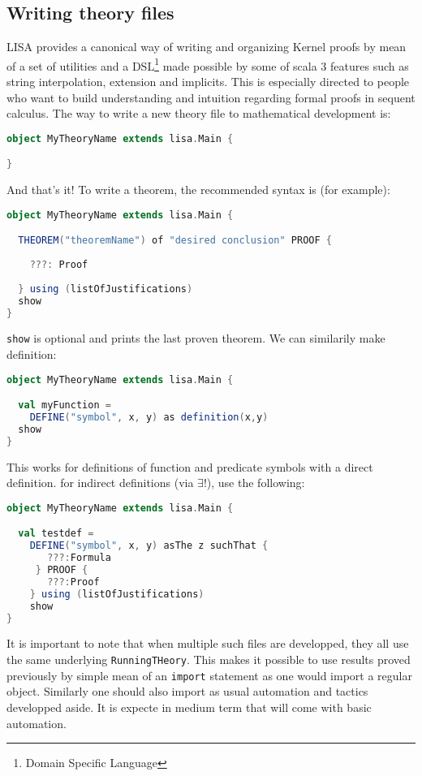 \subsection{Writing theory files}
LISA provides a canonical way of writing and organizing Kernel proofs by mean of a set of utilities and a DSL\footnote{Domain Specific Language} made possible by some of scala 3 features such as string interpolation, extension and implicits. This is especially directed to people who want to build understanding and intuition regarding formal proofs in sequent calculus.
The way to write a new theory file to mathematical development is:
\begin{lstlisting}[language=Scala, frame=single]
object MyTheoryName extends lisa.Main {

}
\end{lstlisting}
And that's it! To write a theorem, the recommended syntax is (for example):

\begin{lstlisting}[language=Scala, frame=single]
object MyTheoryName extends lisa.Main {

  THEOREM("theoremName") of "desired conclusion" PROOF {
    
    ???: Proof
    
  } using (listOfJustifications)
  show
}
\end{lstlisting}
\lstinline{show}{} is optional and prints the last proven theorem. We can similarily make definition:
\begin{lstlisting}[language=Scala, frame=single]
object MyTheoryName extends lisa.Main {

  val myFunction = 
    DEFINE("symbol", x, y) as definition(x,y)
  show
}
\end{lstlisting}
This works for definitions of function and predicate symbols with a direct definition. for indirect definitions (via $\exists !$), use the following:
\begin{lstlisting}[language=Scala, frame=single]
object MyTheoryName extends lisa.Main {

  val testdef =
    DEFINE("symbol", x, y) asThe z suchThat {
       ???:Formula
     } PROOF {
       ???:Proof
    } using (listOfJustifications)
    show
}
\end{lstlisting}

It is important to note that when multiple such files are developped, they all use the same underlying \lstinline{RunningTHeory}{}. This makes it possible to use results proved previously by simple mean of an \lstinline{import}{} statement as one would import a regular object. Similarly one should also import as usual automation and tactics developped aside. It is expecte in medium term that  will come with basic automation.

